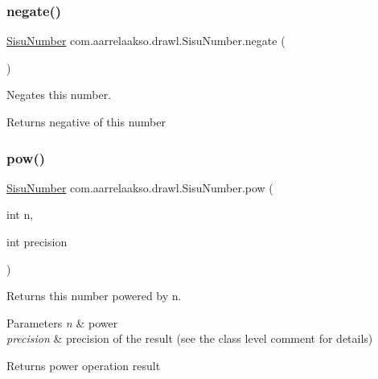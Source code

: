 \subsubsection{\texorpdfstring{negate()}{negate()}}
{\footnotesize\ttfamily \hyperlink{classcom_1_1aarrelaakso_1_1drawl_1_1_sisu_number}{Sisu\+Number} com.\+aarrelaakso.\+drawl.\+Sisu\+Number.\+negate (\begin{DoxyParamCaption}{ }\end{DoxyParamCaption})\hspace{0.3cm}{\ttfamily [protected]}}



Negates this number. 

\begin{DoxyReturn}{Returns}
negative of this number 
\end{DoxyReturn}
\mbox{\label{classcom_1_1aarrelaakso_1_1drawl_1_1_sisu_number_a5946c1e3dcf68a8611e8e7957fe896e0}} 
\subsubsection{\texorpdfstring{pow()}{pow()}}
{\footnotesize\ttfamily \hyperlink{classcom_1_1aarrelaakso_1_1drawl_1_1_sisu_number}{Sisu\+Number} com.\+aarrelaakso.\+drawl.\+Sisu\+Number.\+pow (\begin{DoxyParamCaption}\item[{int}]{n,  }\item[{int}]{precision }\end{DoxyParamCaption})\hspace{0.3cm}{\ttfamily [protected]}}



Returns this number powered by n. 


\begin{DoxyParams}{Parameters}
{\em n} & power \\
\hline
{\em precision} & precision of the result (see the class level comment for details) \\
\hline
\end{DoxyParams}
\begin{DoxyReturn}{Returns}
power operation result 
\end{DoxyReturn}
\mbox{\label{classcom_1_1aarrelaakso_1_1drawl_1_1_sisu_number_a8e3e3d0dc152b97f0d2c23515e870b52}} 
